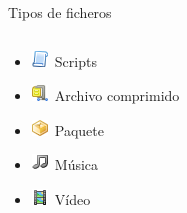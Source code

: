 \begin{frame}{Tipos de ficheros}
\begin{columns}
\begin{column}{0.5\textwidth}
\begin{itemize}
            \item \includegraphics{imgs/script.png}~Scripts
            \item \includegraphics{imgs/compress.png}~Archivo comprimido
            \item \includegraphics{imgs/package.png}~Paquete
            \item \includegraphics{imgs/music.png}~Música
            \item \includegraphics{imgs/film.png}~Vídeo
        \end{itemize}
    \end{column}
    \end{columns}
\end{frame}

